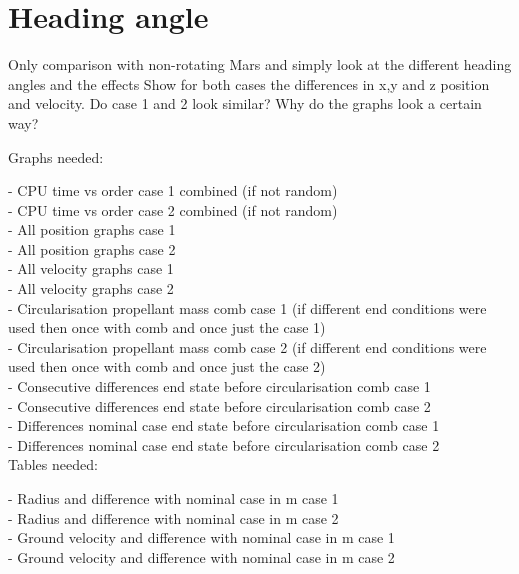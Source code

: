 \section{Heading angle}
\label{sec:headingAngle}

Only comparison with non-rotating Mars and simply look at the different heading angles and the effects
Show for both cases the differences in x,y and z position and velocity. Do case 1 and 2 look similar? Why do the graphs look a certain way?

Graphs needed:

- CPU time vs order case 1 combined (if not random) \\
- CPU time vs order case 2 combined (if not random) \\
- All position graphs case 1 \\
- All position graphs case 2 \\
- All velocity graphs case 1 \\
- All velocity graphs case 2 \\

- Circularisation propellant mass comb case 1 (if different end conditions were used then once with comb and once just the case 1) \\
- Circularisation propellant mass comb case 2 (if different end conditions were used then once with comb and once just the case 2) \\
- Consecutive differences end state before circularisation comb case 1 \\
- Consecutive differences end state before circularisation comb case 2 \\
- Differences nominal case end state before circularisation comb case 1 \\
- Differences nominal case end state before circularisation comb case 2 \\


Tables needed:

- Radius and difference with nominal case in m case 1 \\
- Radius and difference with nominal case in m case 2 \\
- Ground velocity and difference with nominal case in m case 1 \\
- Ground velocity and difference with nominal case in m case 2 \\
